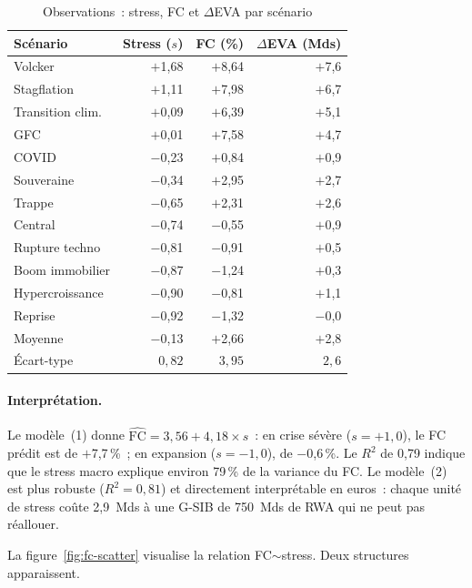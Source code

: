 \documentclass[10pt, a4paper, oneside]{report}
\theoremstyle{definition}
\begin{document}
\begin{table}[htbp]
\centering
\caption{Observations~: stress, FC et $\Delta$EVA par scénario}
\label{tab:fc-ols-data}
\small
\begin{tabular}{lrrr}
\toprule
Scénario & Stress ($s$) & FC (\%) & $\Delta$EVA (Mds) \\
\midrule
Volcker           & $+$1{,}68 & $+$8{,}64 & $+$7{,}6 \\
Stagflation       & $+$1{,}11 & $+$7{,}98 & $+$6{,}7 \\
Transition clim.  & $+$0{,}09 & $+$6{,}39 & $+$5{,}1 \\
GFC               & $+$0{,}01 & $+$7{,}58 & $+$4{,}7 \\
COVID             & $-$0{,}23 & $+$0{,}84 & $+$0{,}9 \\
Souveraine        & $-$0{,}34 & $+$2{,}95 & $+$2{,}7 \\
Trappe            & $-$0{,}65 & $+$2{,}31 & $+$2{,}6 \\
Central           & $-$0{,}74 & $-$0{,}55 & $+$0{,}9 \\
Rupture techno    & $-$0{,}81 & $-$0{,}91 & $+$0{,}5 \\
Boom immobilier   & $-$0{,}87 & $-$1{,}24 & $+$0{,}3 \\
Hypercroissance   & $-$0{,}90 & $-$0{,}81 & $+$1{,}1 \\
Reprise           & $-$0{,}92 & $-$1{,}32 & $-$0{,}0 \\
\midrule
Moyenne           & $-$0{,}13 & $+$2{,}66 & $+$2{,}8 \\
Écart-type        & $0{,}82$  & $3{,}95$  & $2{,}6$ \\
\bottomrule
\end{tabular}
\end{table}

\paragraph{Interprétation.} Le modèle~(1) donne $\widehat{\text{FC}} = 3{,}56 + 4{,}18 \times s$~: en crise sévère ($s = +1{,}0$), le FC prédit est de $+$7{,}7\,\%~; en expansion ($s = -1{,}0$), de $-$0{,}6\,\%. Le $R^2$ de 0{,}79 indique que le stress macro explique environ 79\,\% de la variance du FC. Le modèle~(2) est plus robuste ($R^2 = 0{,}81$) et directement interprétable en euros~: chaque unité de stress coûte 2{,}9~Mds à une G-SIB de 750~Mds de RWA qui ne peut pas réallouer.

La figure~\ref{fig:fc-scatter} visualise la relation FC$\sim$stress. Deux structures apparaissent.
\end{document}
